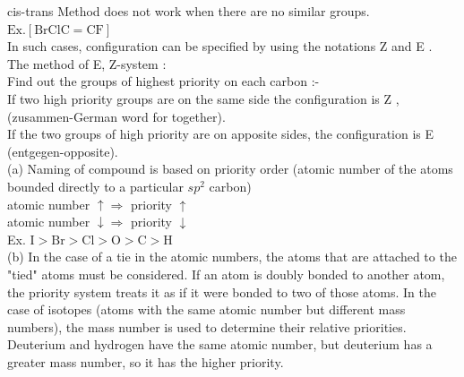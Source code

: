 \documentclass[10pt]{article}
\begin{document}
cis-trans Method does not work when there are no similar groups.\\
$\mathrm{Ex} .[\mathrm{BrClC}=\mathrm{CF}]$\\
In such cases, configuration can be specified by using the notations Z and E .\\
The method of E, Z-system :\\
Find out the groups of highest priority on each carbon :-\\
If two high priority groups are on the same side the configuration is Z , (zusammen-German word for together).\\
If the two groups of high priority are on apposite sides, the configuration is E (entgegen-opposite).\\
(a) Naming of compound is based on priority order (atomic number of the atoms bounded directly to a particular $s p^{2}$ carbon)\\
atomic number $\uparrow \Rightarrow$ priority $\uparrow$\\
atomic number $\downarrow \Rightarrow$ priority $\downarrow$\\
Ex. $\mathrm{I}>\mathrm{Br}>\mathrm{Cl}>\mathrm{O}>\mathrm{C}>\mathrm{H}$\\
(b) In the case of a tie in the atomic numbers, the atoms that are attached to the "tied" atoms must be considered. If an atom is doubly bonded to another atom, the priority system treats it as if it were bonded to two of those atoms. In the case of isotopes (atoms with the same atomic number but different mass numbers), the mass number is used to determine their relative priorities. Deuterium and hydrogen have the same atomic number, but deuterium has a greater mass number, so it has the higher priority.
\end{document}
